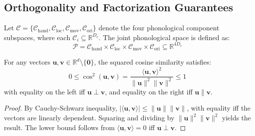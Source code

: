 \documentclass{article}
\begin{document}
\subsection{Orthogonality and Factorization Guarantees}

\begin{definition}
\label{def:component_space}
Let $\mathcal{C} = \{\mathcal{C}_{\text{hand}}, \mathcal{C}_{\text{loc}}, \mathcal{C}_{\text{mov}}, \mathcal{C}_{\text{ori}}\}$ denote the four phonological component subspaces, where each $\mathcal{C}_i \subseteq \mathbb{R}^{D_c}$. The joint phonological space is defined as:
\begin{equation}
\mathcal{P} = \mathcal{C}_{\text{hand}} \times \mathcal{C}_{\text{loc}} \times \mathcal{C}_{\text{mov}} \times \mathcal{C}_{\text{ori}} \subseteq \mathbb{R}^{4D_c}
\end{equation}
\end{definition}

\begin{lemma}
\label{lemma:cosine_bounds}
For any vectors $\mathbf{u}, \mathbf{v} \in \mathbb{R}^d \setminus \{\mathbf{0}\}$, the squared cosine similarity satisfies:
\begin{equation}
0 \leq \cos^2(\mathbf{u}, \mathbf{v}) = \frac{\langle \mathbf{u}, \mathbf{v} \rangle^2}{\|\mathbf{u}\|^2 \|\mathbf{v}\|^2} \leq 1
\end{equation}
with equality on the left iff $\mathbf{u} \perp \mathbf{v}$, and equality on the right iff $\mathbf{u} \parallel \mathbf{v}$.
\end{lemma}

\begin{proof}
By Cauchy-Schwarz inequality, $|\langle \mathbf{u}, \mathbf{v} \rangle| \leq \|\mathbf{u}\| \|\mathbf{v}\|$, with equality iff the vectors are linearly dependent. Squaring and dividing by $\|\mathbf{u}\|^2 \|\mathbf{v}\|^2$ yields the result. The lower bound follows from $\langle \mathbf{u}, \mathbf{v} \rangle = 0$ iff $\mathbf{u} \perp \mathbf{v}$.
\end{proof}
\end{document}
